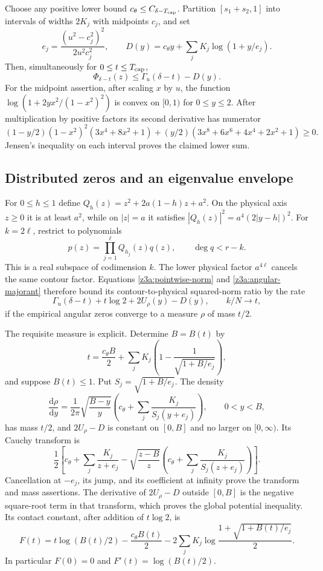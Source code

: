 \documentclass[11pt]{article}
\theoremstyle{definition}\newtheorem{definition}[theorem]{Definition}
\theoremstyle{remark}\newtheorem{remark}[theorem]{Remark}
\begin{document}
Choose any positive lower bound $c_\theta\le C_{\delta-T_{\rm cap}}$.
Partition $[s_1+s_2,1]$ into intervals of widths $2K_j$ with midpoints
$c_j$, and set
\[
 e_j=\frac{(u^2-c_j^2)^2}{2u^2c_j^2},\qquad
 D(y)=c_\theta y+\sum_jK_j\log(1+y/e_j).
\]
Then, simultaneously for $0\le t\le T_{\rm cap}$,
\begin{equation}\label{z3a:angular-majorant}
 \Phi_{\delta-t}(z)\le\Gamma_u(\delta-t)-D(y).
\end{equation}
For the midpoint assertion, after scaling $x$ by $u$, the function
$\log(1+2yx^2/(1-x^2)^2)$ is convex on $[0,1)$ for $0\le y\le2$.
After multiplication by positive factors its second derivative has
numerator
\[
 (1-y/2)(1-x^2)^2(3x^4+8x^2+1)
 +(y/2)(3x^8+6x^6+4x^4+2x^2+1)\ge0.
\]
Jensen's inequality on each interval proves the claimed lower sum.

\subsection{Distributed zeros and an eigenvalue envelope}

For $0\le h\le1$ define
$Q_h(z)=z^2+2a(1-h)z+a^2$.  On the physical axis $z\ge0$ it is at least
$a^2$, while on $|z|=a$ it satisfies
$|Q_h(z)|^2=a^4(2|y-h|)^2$.
For $k=2\ell$, restrict to polynomials
\[
 p(z)=\prod_{j=1}^{\ell}Q_{h_j}(z)q(z),\qquad \deg q<r-k.
\]
This is a real subspace of codimension $k$.  The lower physical factor
$a^{4\ell}$ cancels the same contour factor.  Equations
\eqref{z3a:pointwise-norm} and \eqref{z3a:angular-majorant} therefore
bound its contour-to-physical squared-norm ratio by the rate
\[
 \Gamma_u(\delta-t)+t\log2+
 2U_\rho(y)-D(y),\qquad k/N\longrightarrow t,
\]
if the empirical angular zeros converge to a measure $\rho$ of mass $t/2$.

The requisite measure is explicit.  Determine $B=B(t)$ by
\begin{equation}\label{z3a:angular-mass}
 t=\frac{c_\theta B}{2}+
       \sum_jK_j\left(1-\frac1{\sqrt{1+B/e_j}}\right),
\end{equation}
and suppose $B(t)\le1$.  Put $S_j=\sqrt{1+B/e_j}$.  The density
\[
 \frac{\mathrm d\rho}{\mathrm dy}
 =\frac1{2\pi}\sqrt{\frac{B-y}{y}}
     \left(c_\theta+\sum_j\frac{K_j}{S_j(y+e_j)}\right),
 \qquad0<y<B,
\]
has mass $t/2$, and $2U_\rho-D$ is constant on $[0,B]$ and no larger
on $[0,\infty)$.  Its Cauchy transform is
\[
 \frac12\left[c_\theta+\sum_j\frac{K_j}{z+e_j}
 -\sqrt{\frac{z-B}{z}}
     \left(c_\theta+\sum_j\frac{K_j}{S_j(z+e_j)}\right)\right].
\]
Cancellation at $-e_j$, its jump, and its coefficient at infinity prove
the transform and mass assertions.  The derivative of $2U_\rho-D$
outside $[0,B]$ is the negative square-root term in that transform,
which proves the global potential inequality.  Its contact constant,
after addition of $t\log2$, is
\begin{equation}\label{z3a:F}
 F(t)=t\log(B(t)/2)-\frac{c_\theta B(t)}2
       -2\sum_jK_j\log\frac{1+\sqrt{1+B(t)/e_j}}2.
\end{equation}
In particular $F(0)=0$ and $F'(t)=\log(B(t)/2)$.
\end{document}
